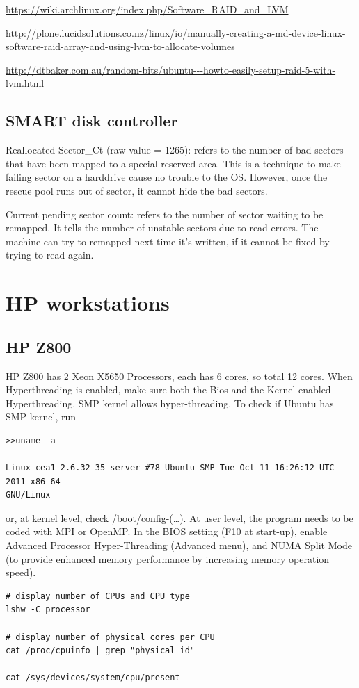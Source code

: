 \url{https://wiki.archlinux.org/index.php/Software_RAID_and_LVM}

\url{http://plone.lucidsolutions.co.nz/linux/io/manually-creating-a-md-device-linux-software-raid-array-and-using-lvm-to-allocate-volumes}

\url{http://dtbaker.com.au/random-bits/ubuntu---howto-easily-setup-raid-5-with-lvm.html}
\subsection{SMART disk controller}

Reallocated Sector\_Ct (raw value = 1265): refers to the number of bad sectors
that have been mapped to a special reserved area. This is a technique to make
failing sector on a harddrive cause no trouble to the OS. However, once the
rescue pool runs out of sector, it cannot hide the bad sectors. 

Current pending sector count: refers to the number of sector waiting to be
remapped. It tells the number of unstable sectors due to read errors. The
machine can try to remapped next time it's written, if it cannot be fixed by
trying to read again. 

\section{HP workstations}

\subsection{HP Z800}
\label{sec:HP_Z800}

HP Z800 has 2 Xeon X5650 Processors, each has 6 cores, so total 12 cores.
When Hyperthreading is enabled, make sure both the Bios and the Kernel enabled
Hyperthreading. SMP kernel allows hyper-threading. To check if Ubuntu has SMP
kernel, run
\begin{verbatim}
>>uname -a

Linux cea1 2.6.32-35-server #78-Ubuntu SMP Tue Oct 11 16:26:12 UTC 2011 x86_64
GNU/Linux
\end{verbatim}
or, at kernel level, check /boot/config-(\ldots). At user level, the program
needs to be coded with MPI or OpenMP. In the BIOS setting (F10 at start-up),
enable Advanced Processor Hyper-Threading (Advanced menu), and NUMA Split Mode
(to provide enhanced memory performance by increasing memory operation speed).

\begin{verbatim}
# display number of CPUs and CPU type
lshw -C processor

# display number of physical cores per CPU
cat /proc/cpuinfo | grep "physical id"

cat /sys/devices/system/cpu/present
\end{verbatim}

